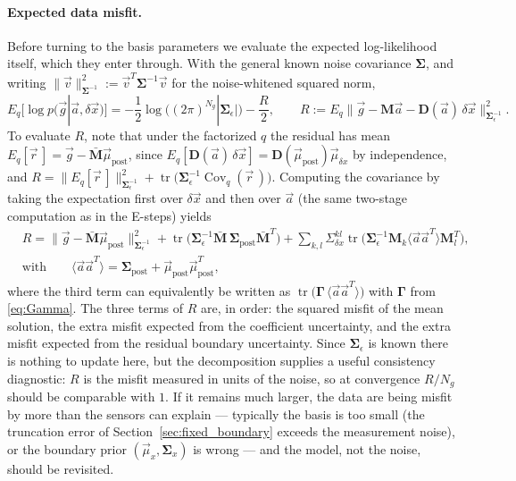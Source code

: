 \documentclass{article}
\begin{document}
\paragraph{Expected data misfit.} Before turning to the basis parameters we evaluate the expected log-likelihood itself, which they enter through. With the general known noise covariance $\mathbf{\Sigma}$, and writing $\|\vec v\|^2_{\mathbf{\Sigma}^{-1}} := \vec v^T\mathbf{\Sigma}^{-1}\vec v$ for the noise-whitened squared norm,
\begin{equation}
    E_q[\log p(\vec g|\vec a, \delta\vec x)] = -\frac{1}{2}\log\big((2\pi)^{N_g}|\mathbf{\Sigma}_\epsilon|\big) - \frac{R}{2}, \qquad R := E_q\big\|\vec g - \mathbf M\vec a - \mathbf D(\vec a)\,\delta\vec x\big\|^2_{\mathbf{\Sigma}_\epsilon^{-1}}. \label{eq:expected_loglik}
\end{equation}
To evaluate $R$, note that under the factorized $q$ the residual has mean $E_q[\vec r\,] = \vec g - \bar{\mathbf M}\vec\mu_{\text{post}}$, since $E_q[\mathbf D(\vec a)\,\delta\vec x] = \mathbf D(\vec\mu_{\text{post}})\vec\mu_{\delta x}$ by independence, and $R = \|E_q[\vec r\,]\|^2_{\mathbf{\Sigma}_\epsilon^{-1}} + \operatorname{tr}\big(\mathbf{\Sigma}_\epsilon^{-1}\operatorname{Cov}_q(\vec r\,)\big)$. Computing the covariance by taking the expectation first over $\delta\vec x$ and then over $\vec a$ (the same two-stage computation as in the E-steps) yields
\begin{align}
    & R = \big\|\vec g - \bar{\mathbf M}\vec\mu_{\text{post}}\big\|^2_{\mathbf{\Sigma}_\epsilon^{-1}} + \operatorname{tr}\big(\mathbf{\Sigma}_\epsilon^{-1}\bar{\mathbf M}\,\mathbf{\Sigma}_{\text{post}}\bar{\mathbf M}^T\big) + \sum_{k,l}\Sigma_{\delta x}^{kl}\operatorname{tr}\big(\mathbf{\Sigma}_\epsilon^{-1}\mathbf M_k \langle \vec a\vec a^T\rangle \mathbf M_l^T\big), 
    \\
    & \text{with} \qquad \langle \vec a \vec a^T\rangle = \mathbf{\Sigma}_{\text{post}} + \vec\mu_{\text{post}}\vec\mu_{\text{post}}^T, \label{eq:R}
\end{align}
where the third term can equivalently be written as $\operatorname{tr}\big(\mathbf\Gamma\,\langle\vec a\vec a^T\rangle\big)$ with $\mathbf\Gamma$ from \eqref{eq:Gamma}. The three terms of $R$ are, in order: the squared misfit of the mean solution, the extra misfit expected from the coefficient uncertainty, and the extra misfit expected from the residual boundary uncertainty. Since $\mathbf{\Sigma}_\epsilon$ is known there is nothing to update here, but the decomposition supplies a useful consistency diagnostic: $R$ is the misfit measured in units of the noise, so at convergence $R/N_g$ should be comparable with $1$. If it remains much larger, the data are being misfit by more than the sensors can explain --- typically the basis is too small (the truncation error of Section~\ref{sec:fixed_boundary} exceeds the measurement noise), or the boundary prior $(\vec\mu_x, \mathbf{\Sigma}_x)$ is wrong --- and the model, not the noise, should be revisited.
\end{document}
